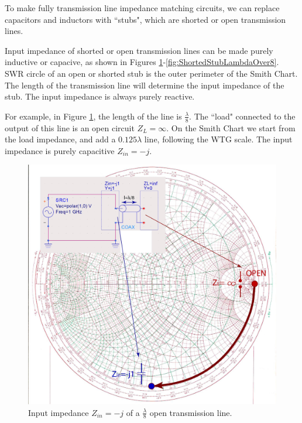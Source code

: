 \documentclass{ximera}
\begin{document}
To make fully transmission line impedance matching circuits, we can replace capacitors and inductors  with ``stubs", which are shorted or open transmission lines. 

Input impedance of shorted or open transmission lines  can be made purely inductive or capacive, as shown in Figures \ref{fig:OpenStubLambdaOver8}-\ref{fig:ShortedStubLambdaOver8}. SWR circle of an open or shorted stub is the outer perimeter of the Smith Chart. The length of the transmission line will determine the input impedance of the stub. The input impedance is always purely reactive. 

For example, in Figure \ref{fig:OpenStubLambdaOver8}, the length of the line is  $\frac{\lambda}{8}$. The ``load" connected to the output of this line is an open circuit $Z_L=\infty$. On the Smith Chart we start from the load impedance, and add a $0.125 \lambda$ line, following the WTG scale. The input impedance is purely capacitive $Z_{in}=-j$. 

\begin{figure}[htbp]
\begin{center}
\includegraphics[scale=0.4]{../jpg/openstub-01.jpg}
\end{center}
\caption{Input impedance $Z_{in}=-j$ of a $\frac{\lambda}{8}$ open transmission line.}
\label{fig:OpenStubLambdaOver8}
\end{figure}
\end{document}
